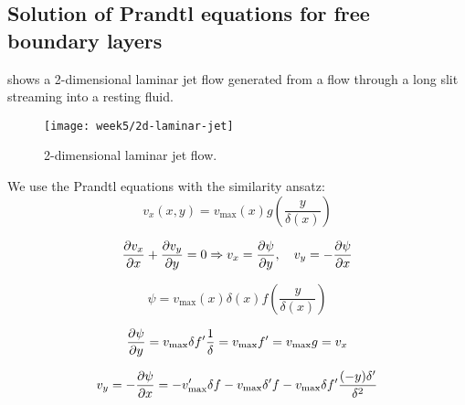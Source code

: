 \subsection{Solution of Prandtl equations for free boundary layers}
 shows a 2-dimensional laminar jet flow generated from a flow through a long slit streaming into a resting fluid.
\begin{figure}[!h]
    \centering
    \texttt{[image: week5/2d-laminar-jet]}\\
    \caption{2-dimensional laminar jet flow.}
    \label{fig:2d-laminar-jet}
\end{figure}

We use the Prandtl equations with the similarity ansatz:
\begin{equation}
v_x(x,y)=v_\mathrm{max}(x)g\left(\frac{y}{\delta(x)}\right)
\end{equation}

\begin{equation}
\frac{\partial v_x}{\partial x}+\frac{\partial v_y}{\partial y}=0 \Rightarrow v_x=\frac{\partial \psi}{\partial y},\quad v_y=-\frac{\partial \psi}{\partial x}
\end{equation}

\begin{equation}
\psi = v_\mathrm{max}(x)\delta(x)f\left(\frac{y}{\delta(x)}\right)
\end{equation}

\begin{equation}
\frac{\partial \psi}{\partial y}=v_\mathrm{max}\delta f'\frac{1}{\delta}=v_\mathrm{max}f'=v_\mathrm{max}g=v_x
\end{equation}

\begin{equation}
v_y=-\frac{\partial \psi}{\partial x}=-v'_\mathrm{max}\delta f-v_\mathrm{max}\delta'f-v_\mathrm{max}\delta f'\frac{(-y)\delta'}{\delta^2}
\end{equation}

